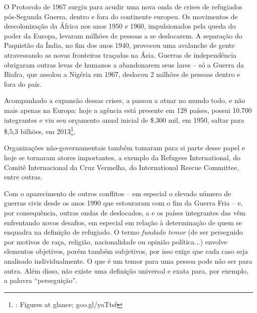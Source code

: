O Protocolo de 1967 surgiu para acudir uma nova onda de crises de
refugiados pós-Segunda Guerra, dentro e fora do continente europeu. Os
movimentos de descolonização da África nos anos 1950 e 1960,
impulsionados pela queda do poder da Europa, levaram milhões de pessoas
a se deslocarem. A separação do Paquistão da Índia, no fim dos anos
1940, provocou uma avalanche de gente atravessando as novas fronteiras
traçadas na Ásia. Guerras de independência obrigaram outras levas de
humanos a abandonarem seus lares -- só a Guerra da Biafra, que assolou
a Nigéria em 1967, deslocou 2 milhões de pessoas dentro e fora do país.

Acompanhado a expansão dessas crises, a  passou a atuar no mundo
todo, e não mais apenas na Europa: hoje a agência está presente em 128
países, possui 10.700 integrantes e viu seu orçamento anual inicial de
\$,300 mil, em 1950, saltar para \$,5,3 bilhões, em 2013\footnote{
	: Figures at glance; 
	goo.gl/yaTtsf}.

Organizações não-governamentais também tomaram para si parte desse papel
e hoje se tornaram atores importantes, a exemplo da Refugees
International, do Comitê Internacional da Cruz Vermelha, do
International Rescue Committee, entre outras.

Com o aparecimento de outros conflitos -- em especial o elevado número
de guerras civis desde os anos 1990 que estouraram com o fim da Guerra
Fria -- e, por consequência, outras ondas de deslocados, a  e os
países integrantes das  vêm enfrentando novos desafios, em especial
em relação à determinação de quem se enquadra na definição de refugiado.
O termo \emph{fundado temor} (de ser perseguido por motivos de raça,
religião, nacionalidade ou opinião política...) envolve elementos
objetivos, porém também subjetivos, por isso exige que cada caso seja
analisado individualmente. O que é um temor para uma pessoa pode não ser
para outra. Além disso, não existe uma definição universal e exata para,
por exemplo, a palavra ``perseguição''.

